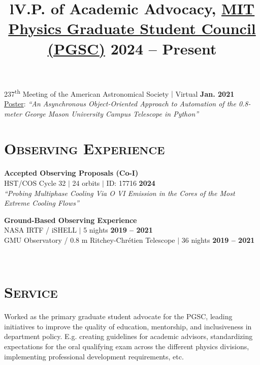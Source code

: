 \documentclass[marg, centered]{res}
\begin{document}
\begin{resume}
\begin{talks}[itemindent=0pt, leftmargin=19pt]
\item 237\textsuperscript{th} Meeting of the American Astronomical Society $|$ Virtual \hfill \textbf{Jan. 2021}\\
\href{https://ui.adsabs.harvard.edu/abs/2021AAS...23734407R/abstract}{\color{dkbu} Poster}: \textit{``An Asynchronous Object-Oriented Approach to Automation of the 0.8-meter George Mason University Campus Telescope in Python''}

\end{talks}


\section{{\scshape \bfseries Observing Experience}}

\textbf{Accepted Observing Proposals (Co-I)} \\
HST/COS Cycle 32 $|$ 24 orbits $|$ ID: 17716 \hfill \textbf{2024} \\
\textit{``Probing Multiphase Cooling Via O VI Emission in the Cores of the Most Extreme Cooling Flows''}

\textbf{Ground-Based Observing Experience} \\
NASA IRTF / iSHELL $|$ 5 nights \hfill \textbf{2019 -- 2021} \\
GMU Observatory / 0.8 m Ritchey-Chr\'etien Telescope $|$ 36 nights \hfill \textbf{2019 -- 2021}


\begin{format}
\title{l} \\
\body
\end{format}

\section{{\scshape \bfseries Service}}

\title{\textbf{V.P. of Academic Advocacy}, \href{https://physics-gsc.scripts.mit.edu/home/}{\color{dkbu} MIT Physics Graduate Student Council (PGSC)} \hfill \textbf{2024 -- Present}}
\begin{position}
{\small Worked as the primary graduate student advocate for the PGSC, leading initiatives to improve the quality of education, mentorship, and inclusiveness in department policy.  E.g. creating guidelines for academic advisors, standardizing expectations for the oral qualifying exam across the different physics divisions, implementing professional development requirements, etc.}
\end{position}


\end{resume}
\end{document}
